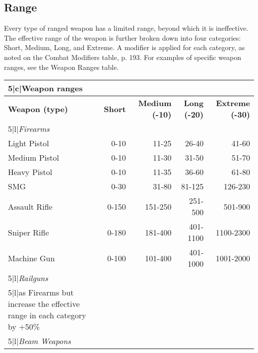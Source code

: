 \subsection{Range} \label{sec:range} 

Every type of ranged weapon has a limited range, beyond which it is ineffective. The effective range of the weapon is further broken down into four categories: Short, Medium, Long, and Extreme. A modifier is applied for each category, as noted on the Combat Modifiers table, p. 193. For examples of specific weapon ranges, see the Weapon Ranges table. 

\begin{table} \begin{tabularx}{\hline}{|X|r|r|r|r|} \hline

\hline{5}{|c|}{\textbf{Weapon ranges}} \\ \hline

\textbf{Weapon (type)} &\textbf{Short} &\textbf{Medium (-10)} &\textbf{Long (-20)} &\textbf{Extreme (-30)}\\ \hline

\hline{5}{|l|}{\emph{Firearms}} \\ \hline

Light Pistol	&0-10	&11-25	&26-40	&41-60	\\ \hline

Medium Pistol	&0-10	&11-30	&31-50	&51-70	\\ \hline

Heavy Pistol	&0-10	&11-35	&36-60	&61-80	\\ \hline

SMG	&0-30	&31-80	&81-125	&126-230	\\ \hline

Assault Rifle	&0-150	&151-250	&251-500	&501-900	\\ \hline

Sniper Rifle	&0-180	&181-400	&401-1100	&1100-2300	\\ \hline

Machine Gun	&0-100	&101-400	&401-1000	&1001-2000	\\ \hline

\hline{5}{|l|}{\emph{Railguns}}\\ \hline

\hline{5}{|l|}{as Firearms but increase the effective range in each category by +50\%} \\ \hline

\hline{5}{|l|}{\emph{Beam Weapons}} \\ \hline


\end{tabularx}
\end{table}
